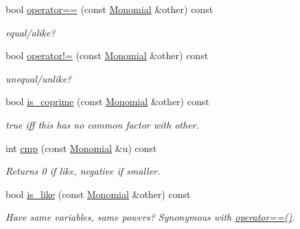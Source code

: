 \begin{Indent}
\begin{DoxyCompactItemize}
\mbox{\label{class_monomial_a063e7166a4bf8abc8748f8758cc31d73}} 
bool \hyperlink{class_monomial_a063e7166a4bf8abc8748f8758cc31d73}{operator==} (const \hyperlink{class_monomial}{Monomial} \&other) const
\begin{DoxyCompactList}\small\item\em equal/alike? \end{DoxyCompactList}\item 
\mbox{\label{class_monomial_a0fb6394c2de8d206d119783707618db7}} 
bool \hyperlink{class_monomial_a0fb6394c2de8d206d119783707618db7}{operator!=} (const \hyperlink{class_monomial}{Monomial} \&other) const
\begin{DoxyCompactList}\small\item\em unequal/unlike? \end{DoxyCompactList}\item 
\mbox{\label{class_monomial_afa3c3085358be86a5f593d7259f80000}} 
bool \hyperlink{class_monomial_afa3c3085358be86a5f593d7259f80000}{is\+\_\+coprime} (const \hyperlink{class_monomial}{Monomial} \&other) const
\begin{DoxyCompactList}\small\item\em {\ttfamily true} iff {\ttfamily this} has no common factor with {\ttfamily other}. \end{DoxyCompactList}\item 
\mbox{\label{class_monomial_adf3fd71374a0058b653edd441b8dfb5d}} 
int \hyperlink{class_monomial_adf3fd71374a0058b653edd441b8dfb5d}{cmp} (const \hyperlink{class_monomial}{Monomial} \&u) const
\begin{DoxyCompactList}\small\item\em Returns 0 if like, negative if smaller. \end{DoxyCompactList}\item 
\mbox{\label{class_monomial_a563c96b359a1faa97d73be48576c1d42}} 
bool \hyperlink{class_monomial_a563c96b359a1faa97d73be48576c1d42}{is\+\_\+like} (const \hyperlink{class_monomial}{Monomial} \&other) const
\begin{DoxyCompactList}\small\item\em Have same variables, same powers? Synonymous with \hyperlink{class_monomial_a063e7166a4bf8abc8748f8758cc31d73}{operator==()}. \end{DoxyCompactList}\item 

\end{DoxyCompactItemize}
\end{Indent}
